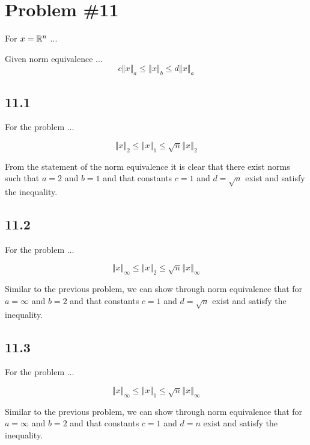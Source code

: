 \section*{Problem \#11}

For $x = \mathbb{R}^{n}$ ...

\noindent Given norm equivalence ...
$$ c\left\Vert x \right\Vert_{a} \leq \left\Vert x \right\Vert_{b} \leq d \left\Vert x \right\Vert_{a} $$

\subsection*{11.1}
For the problem ...

$$ \left\Vert x \right\Vert_{2} \leq \left\Vert x \right\Vert_{1} \leq \sqrt{n} \left\Vert x \right\Vert_{2} $$

\noindent From the statement of the norm equivalence it is clear that there exist norms such that $a=2$ and $b=1$ and that constants $c=1$ and $d=\sqrt{n}$ exist and satisfy the inequality.

\subsection*{11.2}

For the problem ...

$$ \left\Vert x \right\Vert_{\infty} \leq \left\Vert x \right\Vert_{2} \leq \sqrt{n} \left\Vert x \right\Vert_{\infty} $$

\noindent Similar to the previous problem, we can show through norm equivalence that for $a=\infty$ and $b=2$ and that constants $c=1$ and $d=\sqrt{n}$ exist and satisfy the inequality.

\subsection*{11.3}

For the problem ...

$$ \left\Vert x \right\Vert_{\infty} \leq \left\Vert x \right\Vert_{1} \leq \sqrt{n} \left\Vert x \right\Vert_{\infty} $$

\noindent Similar to the previous problem, we can show through norm equivalence that for $a=\infty$ and $b=2$ and that constants $c=1$ and $d=n$ exist and satisfy the inequality.
